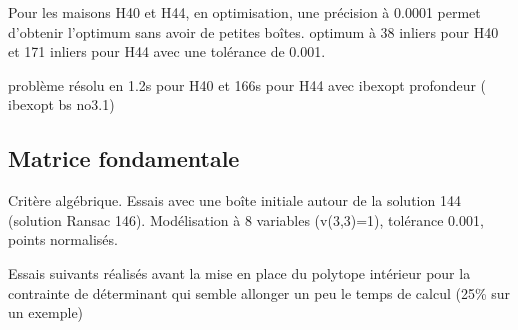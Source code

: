 \documentclass{article}
\begin{document}
Pour les maisons H40 et H44, en optimisation, une pr\'ecision à 0.0001 permet d'obtenir l'optimum sans avoir de petites boîtes.  optimum à 38 inliers pour H40 et 171 inliers pour H44 avec une tol\'erance de 0.001.

probl\`eme r\'esolu en 1.2s pour H40 et 166s pour H44  avec ibexopt profondeur ( ibexopt bs no3.1)

\subsection{Matrice fondamentale}

Crit\`ere alg\'ebrique. Essais avec une bo\^ite initiale autour de la solution  144    (solution Ransac 146).
Mod\'elisation \`a 8 variables (v(3,3)=1), tol\'erance 0.001, points normalis\'es.

Essais suivants r\'ealis\'es avant la mise en place du polytope int\'erieur pour la contrainte de d\'eterminant
qui semble allonger un peu le temps de calcul (25\% sur un exemple) 
\end{document}
